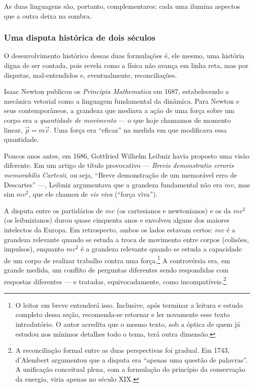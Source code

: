 As duas linguagens são, portanto, complementares: cada uma ilumina aspectos que a
outra deixa na sombra.


\subsubsection*{Uma disputa histórica de dois séculos}
 
O desenvolvimento histórico dessas duas formulações é, ele mesmo, uma história digna
de ser contada, pois revela como a física não avança em linha reta, mas por disputas,
mal-entendidos e, eventualmente, reconciliações.
 
Isaac Newton publicou os \textit{Principia Mathematica} em 1687, estabelecendo a
mecânica vetorial como a linguagem fundamental da dinâmica. Para Newton e seus
contemporâneos, a grandeza que mediava a ação de uma força sobre um corpo era a
\textit{quantidade de movimento} --- o que hoje chamamos de momento linear,
$\vec{p} = m\vec{v}$. Uma força era ``eficaz'' na medida em que modificava essa
quantidade.
 
Poucos anos antes, em 1686, Gottfried Wilhelm Leibniz havia proposto uma visão
diferente. Em um artigo de título provocativo --- \textit{Brevis demonstratio erroris
memorabilis Cartesii}, ou seja, ``Breve demonstração de um memorável erro de
Descartes'' ---, Leibniz argumentava que a grandeza fundamental não era $mv$, mas
sim $mv^2$, que ele chamou de \textit{vis viva} (``força viva'').

A disputa entre os partidários de $mv$ (os cartesianos e newtonianos) e os da
$mv^2$ (os leibnizianos) durou quase cinquenta anos e envolveu alguns dos maiores
intelectos da Europa. Em retrospecto, ambos os lados estavam certos: $mv$ é a
grandeza relevante quando se estuda a troca de movimento entre corpos (colisões,
impulsos), enquanto $mv^2$ é a grandeza relevante quando se estuda a capacidade de
um corpo de realizar trabalho contra uma força.\footnote{O leitor em breve entenderá isso. Inclusive, após terminar a leitura e estudo completo dessa seção, recomenda-se retornar e ler novamente esse texto introdutório. O autor acredita que o mesmo texto, sob a óptica de quem já estudou nos mínimos detalhes todo o tema, terá outra dimensão.} A controvérsia era, em grande medida,
um conflito de perguntas diferentes sendo respondidas com respostas diferentes --- e
tratadas, equivocadamente, como incompatíveis.\footnote{A reconciliação formal entre
as duas perspectivas foi gradual. Em 1743, d'Alembert argumentou que a disputa era
``apenas uma questão de palavras''. A unificação conceitual plena, com a formulação
do princípio da conservação da energia, viria apenas no século XIX.}
 
